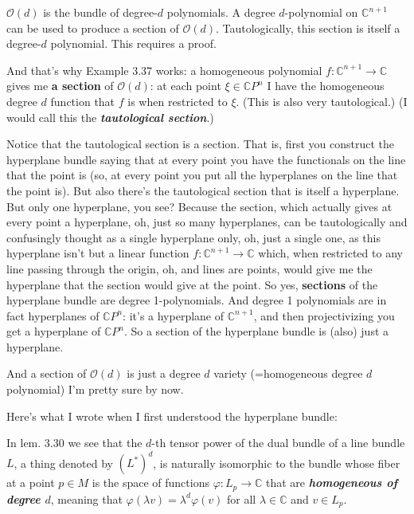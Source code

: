 \begin{upshot}\leavevmode
\(\mathcal{O}(d)\) is the bundle of degree-\(d\) polynomials. A degree \(d\)-polynomial on \(\mathbb{C}^{n+1}\) can be used to produce a section of \(\mathcal{O}(d)\). Tautologically, this section is itself a degree-\(d\) polynomial. This requires a proof.
\end{upshot}
And that's why \cite{lec} Example 3.37 works: a homogeneous polynomial \(f: \mathbb{C}^{n+1}\to \mathbb{C}\) gives me \textbf{a section} of \(\mathcal{O}(d)\): at each point \(\xi \in \mathbb{C}P^{n}\) I have the homogeneous degree \(d\) function that \(f\) is when restricted to \(\xi\). (This is also very tautological.) (I would call this the \textit{\textbf{tautological section}}.)

Notice that the tautological section is a section. That is, first you construct the hyperplane bundle saying that at every point you have the functionals on the line that the point is (so, at every point you put all the hyperplanes on the line that the point is). But also there's the tautological section that is itself a hyperplane. But only one hyperplane, you see? Because the section, which actually gives at every point a hyperplane, oh, just so many hyperplanes, can be tautologically and confusingly thought as a single hyperplane only, oh, just a single one, as this hyperplane isn't but a linear function \(f:\mathbb{C}^{n+1}\to \mathbb{C}\) which, when restricted to any line passing through the origin, oh, and lines are points, would give me the hyperplane that the section would give at the point. So yes, \textbf{sections} of the hyperplane bundle are degree 1-polynomials. And degree 1 polynomials are in fact hyperplanes of \(\mathbb{C}P^n\): it's a hyperplane of \(\mathbb{C}^{n+1}\), and then projectivizing you get a hyperplane of \(\mathbb{C}P^n\). So a section of the hyperplane bundle is (also) just a hyperplane.

And a section of \(\mathcal{O}(d)\) is just a degree \(d\) variety (=homogeneous degree \(d\) polynomial) I'm pretty sure by now.


Here's what I wrote when I first understood the hyperplane bundle:

In lem. 3.30 \cite{lec} we see that the $d$-th tensor power of the dual bundle of a line bundle $L$, a thing denoted by $(L^*)^d$, is naturally isomorphic to the bundle whose fiber at a point $p \in M$ is the space of functions $\varphi:L_p\to \mathbb{C}$ that are \textit{\textbf{homogeneous of degree $d$}}, meaning that $\varphi(\lambda v)=\lambda^d \varphi(v)$ for all $\lambda \in \mathbb{C}$ and $v \in L_p$.

